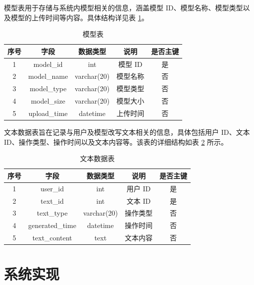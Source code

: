模型表用于存储与系统内模型相关的信息，涵盖模型 ID、模型名称、模型类型以及模型的上传时间等内容。具体结构详见表 \ref{tab:model-table}。

\begin{table}[htb]
    \centering
    \caption{模型表} \label{tab:model-table}
    \begin{tabular}{ccccc}
        \toprule
        \textbf{序号} & \textbf{字段} & \textbf{数据类型} & \textbf{说明} & \textbf{是否主键} \\
        \midrule
        1 & model\_id & int & 模型 ID & 是 \\
        2 & model\_name & varchar(20) & 模型名称 & 否 \\
        3 & model\_type & varchar(20) & 模型类型 & 否 \\
        4 & model\_size & varchar(20) & 模型大小 & 否 \\
        5 & upload\_time & datetime & 上传时间 & 否 \\
        \bottomrule
    \end{tabular}
\end{table}

文本数据表旨在记录与用户及模型改写文本相关的信息，具体包括用户 ID、文本 ID、操作类型、操作时间以及文本内容等。该表的详细结构如表 \ref{tab:text-table} 所示。

\begin{table}[htbp]
    \centering
    \caption{文本数据表} \label{tab:text-table}
    \begin{tabular}{ccccc}
        \toprule
        \textbf{序号} & \textbf{字段} & \textbf{数据类型} & \textbf{说明} & \textbf{是否主键} \\
        \midrule
        1 & user\_id & int & 用户 ID & 是 \\
        2 & text\_id & int & 文本 ID & 是 \\
        3 & text\_type & varchar(20) & 操作类型 & 否 \\
        4 & generated\_time & datetime & 操作时间 & 否 \\
        5 & text\_content & text & 文本内容 & 否 \\
        \bottomrule
    \end{tabular}
\end{table}

\section{系统实现}
\label{sec:sys-implement}

